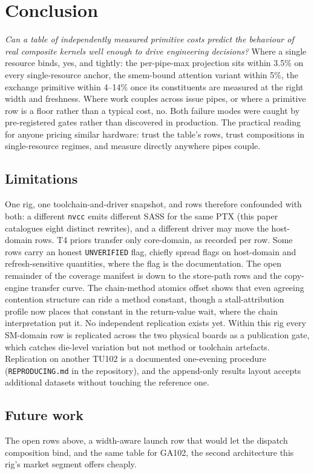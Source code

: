\section{Conclusion}
\label{sec:conclusion}

\emph{Can a table of independently measured primitive costs predict the
behaviour of real composite kernels well enough to drive engineering
decisions?} Where a single resource binds, yes, and tightly: the
per-pipe-max projection sits within 3.5\% on every single-resource
anchor, the smem-bound attention variant within 5\%, the exchange
primitive within 4--14\% once its constituents are measured at the
right width and freshness. Where work couples across issue
pipes, or where a primitive row is a floor rather than a typical cost,
no. Both failure modes were caught by pre-registered gates rather
than discovered in production. The practical reading for anyone pricing
similar hardware: trust the table's rows, trust compositions in
single-resource regimes, and measure directly anywhere pipes couple.

\subsection{Limitations}

One rig, one toolchain-and-driver snapshot, and rows therefore
confounded with both: a different \texttt{nvcc} emits different SASS for
the same PTX (this paper catalogues eight distinct rewrites), and a
different driver may move the host-domain rows. T4 priors transfer only
core-domain, as recorded per row. Some rows carry an honest
\texttt{UNVERIFIED} flag, chiefly spread flags on host-domain and
refresh-sensitive quantities, where the flag is the documentation. The
open remainder of the coverage manifest is down to the store-path rows
and the copy-engine transfer curve. The chain-method atomics offset
shows that even agreeing contention structure can ride a method
constant, though a stall-attribution profile now places that constant
in the return-value wait, where the chain interpretation put it. No independent replication exists yet. Within this rig every
SM-domain row is replicated across the two physical boards as a
publication gate, which catches die-level variation but not method or
toolchain artefacts. Replication on another TU102 is a documented
one-evening procedure (\texttt{REPRODUCING.md} in the repository), and
the append-only results layout accepts additional datasets without
touching the reference one.

\subsection{Future work}

The open rows above, a width-aware launch row that would let the
dispatch composition bind, and the same table for GA102, the second
architecture this rig's market segment offers cheaply.
